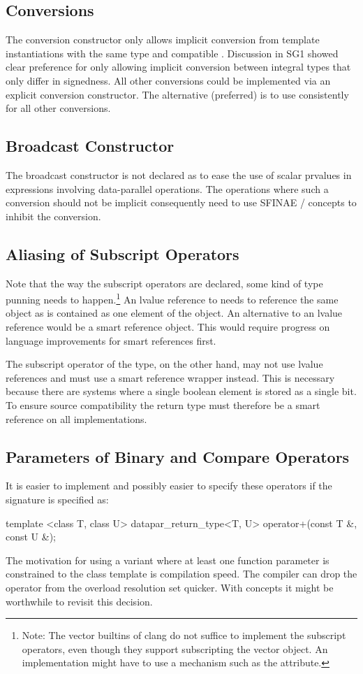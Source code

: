 \subsection{Conversions}
The \datapar conversion constructor only allows implicit conversion from \datapar template instantiations with the same  type and compatible .
Discussion in SG1 showed clear preference for only allowing implicit conversion between integral types that only differ in signedness.
All other conversions could be implemented via an explicit conversion constructor.
The alternative (preferred) is to use \simdcast consistently for all other conversions.

\subsection{Broadcast Constructor}
The broadcast constructor is not declared as  to ease the use of scalar prvalues in expressions involving data-parallel operations.
The operations where such a conversion should not be implicit consequently need to use SFINAE / concepts to inhibit the conversion.

\subsection{Aliasing of Subscript Operators}
Note that the way the subscript operators are declared, some kind of type punning needs to happen.\footnote{
  Note: The vector builtins of clang do not suffice to implement the subscript operators, even though they support subscripting the vector object.
  An implementation might have to use a mechanism such as the  attribute.
}
An lvalue reference to  needs to reference the same object as is contained as one element of the \datapar object.
An alternative to an lvalue reference would be a smart reference object.
This would require progress on language improvements for smart references first.

The subscript operator of the \mask type, on the other hand, may not use lvalue references and must use a smart reference wrapper instead.
This is necessary because there are systems where a single boolean element is stored as a single bit.
To ensure source compatibility the return type must therefore be a smart reference on all implementations.

\subsection{Parameters of Binary and Compare Operators}
It is easier to implement and possibly easier to specify these operators if the signature is specified as:
\begin{itemdecl}
template <class T, class U>
datapar_return_type<T, U> operator+(const T &, const U &);
\end{itemdecl}
The motivation for using a variant where at least one function parameter is constrained to the \datapar class template is compilation speed.
The compiler can drop the operator from the overload resolution set quicker.
With concepts it might be worthwhile to revisit this decision.


